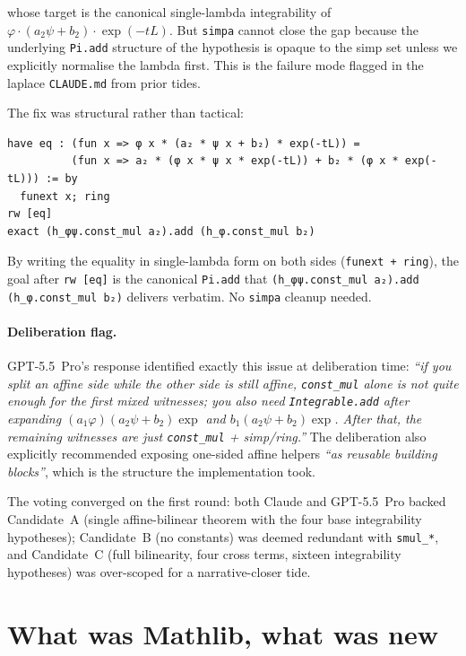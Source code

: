 \documentclass[11pt]{article}
\begin{document}
whose target is the canonical single-lambda integrability of
$\varphi \cdot (a_2 \psi + b_2) \cdot \exp(-tL)$. But
\texttt{simpa} cannot close the gap because the underlying
\texttt{Pi.add} structure of the hypothesis is opaque to the simp set
unless we explicitly normalise the lambda first. This is the failure
mode flagged in the laplace \texttt{CLAUDE.md} from prior tides.

The fix was structural rather than tactical:

\begin{verbatim}
have eq : (fun x => φ x * (a₂ * ψ x + b₂) * exp(-tL)) =
          (fun x => a₂ * (φ x * ψ x * exp(-tL)) + b₂ * (φ x * exp(-tL))) := by
  funext x; ring
rw [eq]
exact (h_φψ.const_mul a₂).add (h_φ.const_mul b₂)
\end{verbatim}

By writing the equality in single-lambda form on both sides
(\texttt{funext + ring}), the goal after \texttt{rw [eq]} is the
canonical \texttt{Pi.add} that
\texttt{(h\_φψ.const\_mul a₂).add (h\_φ.const\_mul b₂)} delivers
verbatim. No \texttt{simpa} cleanup needed.

\paragraph{Deliberation flag.} GPT-5.5~Pro's response identified
exactly this issue at deliberation time: \emph{``if you split an affine
side while the other side is still affine, \texttt{const\_mul} alone is
not quite enough for the first mixed witnesses; you also need
\texttt{Integrable.add} after expanding $(a_1\varphi)(a_2\psi + b_2)\exp$
and $b_1(a_2\psi + b_2)\exp$. After that, the remaining witnesses are
just \texttt{const\_mul} + simp/ring.''} The deliberation also explicitly
recommended exposing one-sided affine helpers \emph{``as reusable building
blocks''}, which is the structure the implementation took.

The voting converged on the first round: both Claude and GPT-5.5~Pro
backed Candidate~A (single affine-bilinear theorem with the four base
integrability hypotheses); Candidate~B (no constants) was deemed
redundant with \texttt{smul\_*}, and Candidate~C (full bilinearity, four
cross terms, sixteen integrability hypotheses) was over-scoped for a
narrative-closer tide.

\section{What was Mathlib, what was new}
\end{document}
